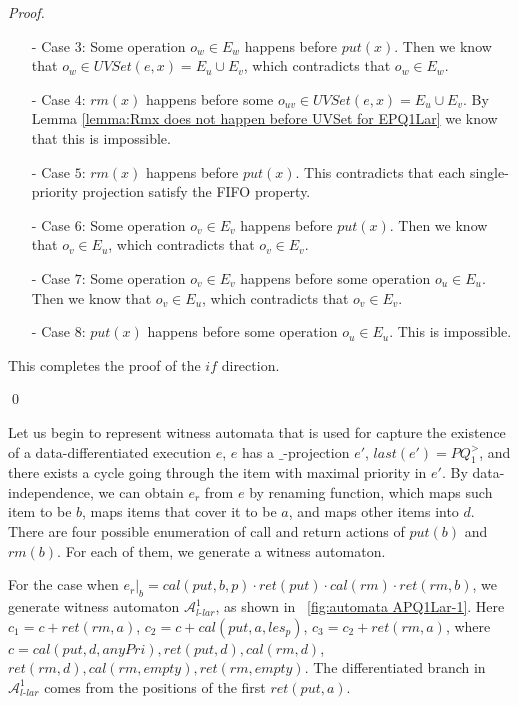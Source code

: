 \begin {proof}
\begin{itemize}
\item[-] Case $3$: Some operation $o_w \in E_w$ happens before $\textit{put}(x)$. Then we know that $o_w \in \textit{UVSet}(e,x) = E_u \cup E_v$, which contradicts that $o_w \in E_w$.

\item[-] Case $4$: $\textit{rm}(x)$ happens before some $o_{\textit{uv}} \in \textit{UVSet}(e,x) = E_u \cup E_v$. By Lemma \ref{lemma:Rmx does not happen before UVSet for EPQ1Lar} we know that this is impossible.

\item[-] Case $5$: $\textit{rm}(x)$ happens before $\textit{put}(x)$. This contradicts that each single-priority projection satisfy the FIFO property.

\item[-] Case $6$: Some operation $o_v \in E_v$ happens before $\textit{put}(x)$. Then we know that $o_v \in E_u$, which contradicts that $o_v \in E_v$.

\item[-] Case $7$: Some operation $o_v \in E_v$ happens before some operation $o_u \in E_u$. Then we know that $o_v \in E_u$, which contradicts that $o_v \in E_v$.

\item[-] Case $8$: $\textit{put}(x)$ happens before some operation $o_u \in E_u$. This is impossible.
\end{itemize}

This completes the proof of the $\textit{if}$ direction.

\qed
\end {proof}


Let us begin to represent witness automata that is used for capture the existence of a data-differentiated execution $e$, $e$ has a $\_$-projection $e'$, $\textit{last}(e') = \textit{PQ}_1^{>}$, and there exists a cycle going through the item with maximal priority in $e'$. By data-independence, we can obtain $e_r$ from $e$ by renaming function, which maps such item to be $b$, maps items that cover it to be $a$, and maps other items into $d$. There are four possible enumeration of call and return actions of $\textit{put}(b)$ and $\textit{rm}(b)$. For each of them, we generate a witness automaton.

For the case when $e_r \vert_{b} = \textit{cal}(\textit{put},b,p) \cdot \textit{ret}(\textit{put}) \cdot \textit{cal}(\textit{rm}) \cdot \textit{ret}(\textit{rm},b)$, we generate witness automaton $\mathcal{A}_{\textit{l-lar}}^1$, as shown in \figurename~\ref{fig:automata APQ1Lar-1}. Here $c_1 = c + \textit{ret}(\textit{rm},a)$, $c_2 = c + \textit{cal}(\textit{put},a,\textit{les}_p)$, $c_3 = c_2 + \textit{ret}(\textit{rm},a)$, where $c = \textit{cal}(\textit{put},d,\textit{anyPri}),\textit{ret}(\textit{put},d), \textit{cal}(\textit{rm},d)$, $\textit{ret}(\textit{rm},d),\textit{cal}(\textit{rm},\textit{empty}),\textit{ret}(\textit{rm},\textit{empty})$. The differentiated branch in $\mathcal{A}_{\textit{l-lar}}^1$ comes from the positions of the first $\textit{ret}(\textit{put},a)$.

